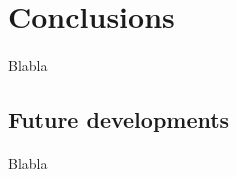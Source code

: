 \documentclass[letterpaper,twocolumn,10pt]{article}
\begin{document}
\section{Conclusions}
\paragraph{}
Blabla

\subsection{Future developments}
\paragraph{}
Blabla


{\footnotesize 

}

\theendnotes

\end{document}
